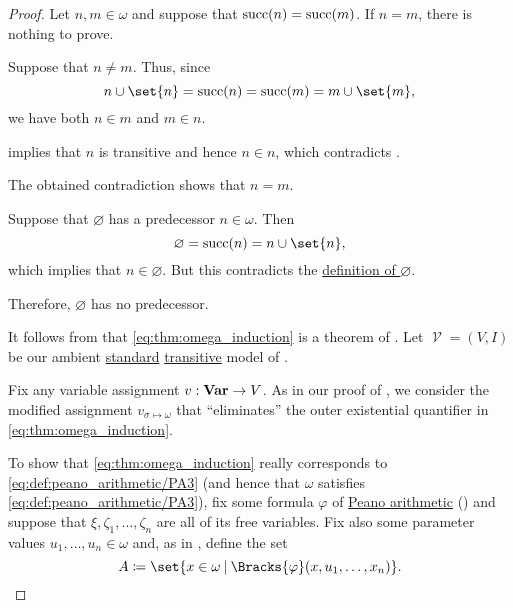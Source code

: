 \begin{proof}
   Let \( n, m \in \omega \) and suppose that \( \operatorname{succ}(n) = \operatorname{succ}(m) \). If \( n = m \), there is nothing to prove.

  Suppose that \( n \neq m \). Thus, since
  \begin{equation*}
    n \cup \set{ n } = \op{succ}(n) = \op{succ}(m) = m \cup \set{ m },
  \end{equation*}
  we have both \( n \in m \) and \( m \in n \).

   implies that \( n \) is transitive and hence \( n \in n \), which contradicts .

  The obtained contradiction shows that \( n = m \).

   Suppose that \( \varnothing \) has a predecessor \( n \in \omega \). Then
  \begin{equation*}
    \varnothing = \op{succ}(n) = n \cup \set{ n },
  \end{equation*}
  which implies that \( n \in \varnothing \). But this contradicts the \hyperref[def:empty_set]{definition of \( \varnothing \)}.

  Therefore, \( \varnothing \) has no predecessor.

   It follows from  that \eqref{eq:thm:omega_induction} is a theorem of . Let \( \mscrV = (V, I) \) be our ambient \hyperref[rem:standard_model_of_set_theory]{standard} \hyperref[rem:transitive_model_of_set_theory]{transitive} model of .

  Fix any variable assignment \( v: \operatorname{\mathbf{Var}} \to V \). As in our proof of , we consider the modified assignment \( v_{\sigma \mapsto \omega} \) that \enquote{eliminates} the outer existential quantifier in \eqref{eq:thm:omega_induction}.

  To show that \eqref{eq:thm:omega_induction} really corresponds to \eqref{eq:def:peano_arithmetic/PA3} (and hence that \( \omega \) satisfies \eqref{eq:def:peano_arithmetic/PA3}), fix some formula \( \varphi \) of \hyperref[def:peano_arithmetic]{Peano arithmetic} () and suppose that \( \xi, \zeta_1, \ldots, \zeta_n \) are all of its free variables. Fix also some parameter values \( u_1, \ldots, u_n \in \omega \) and, as in , define the set
  \begin{equation*}
    A \coloneqq \set{ x \in \omega \given \Bracks{\varphi}(x, u_1, \ldots, x_n) }.
  \end{equation*}


\end{proof}
